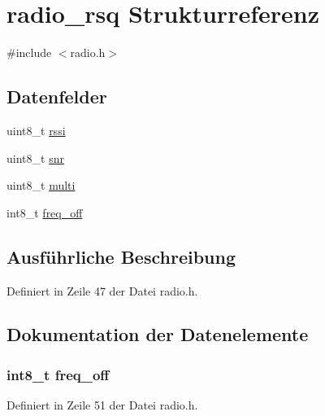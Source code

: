 \hypertarget{structradio__rsq}{}\section{radio\+\_\+rsq Strukturreferenz}
\label{structradio__rsq}


{\ttfamily \#include $<$radio.\+h$>$}

\subsection*{Datenfelder}
\begin{DoxyCompactItemize}
\item 
uint8\+\_\+t \hyperlink{structradio__rsq_afb67d818cd76cce8057affabcb1979a6}{rssi}
\item 
uint8\+\_\+t \hyperlink{structradio__rsq_a11be3c6f2d5194542e5d1733cbc7ac76}{snr}
\item 
uint8\+\_\+t \hyperlink{structradio__rsq_af829dbd700d1c5ad1abccbdb52fa7ba9}{multi}
\item 
int8\+\_\+t \hyperlink{structradio__rsq_a168a73926de154445f6c6c77f8b5e53c}{freq\+\_\+off}
\end{DoxyCompactItemize}


\subsection{Ausführliche Beschreibung}


Definiert in Zeile 47 der Datei radio.\+h.



\subsection{Dokumentation der Datenelemente}
\hypertarget{structradio__rsq_a168a73926de154445f6c6c77f8b5e53c}{}
\subsubsection[{freq\+\_\+off}]{\setlength{\rightskip}{0pt plus 5cm}int8\+\_\+t freq\+\_\+off}\label{structradio__rsq_a168a73926de154445f6c6c77f8b5e53c}


Definiert in Zeile 51 der Datei radio.\+h.

\hypertarget{structradio__rsq_af829dbd700d1c5ad1abccbdb52fa7ba9}{}
